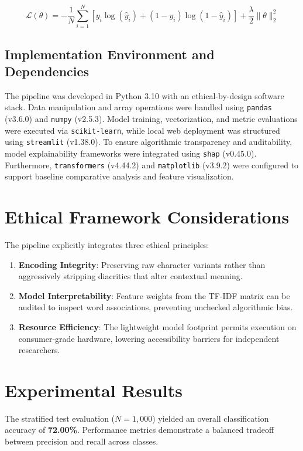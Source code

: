 \documentclass[11pt,a4paper]{article}
\begin{document}
\begin{equation}
\mathcal{L}(\theta) = -\frac{1}{N} \sum_{i=1}^{N} \left[ y_i \log(\hat{y}_i) + (1 - y_i) \log(1 - \hat{y}_i) \right] + \frac{\lambda}{2} \|\theta\|_2^2
\end{equation}

\subsection{Implementation Environment and Dependencies}
The pipeline was developed in Python 3.10 with an ethical-by-design software stack. Data manipulation and array operations were handled using \texttt{pandas} (v3.6.0) and \texttt{numpy} (v2.5.3). Model training, vectorization, and metric evaluations were executed via \texttt{scikit-learn}, while local web deployment was structured using \texttt{streamlit} (v1.38.0). To ensure algorithmic transparency and auditability, model explainability frameworks were integrated using \texttt{shap} (v0.45.0). Furthermore, \texttt{transformers} (v4.44.2) and \texttt{matplotlib} (v3.9.2) were configured to support baseline comparative analysis and feature visualization.

\section{Ethical Framework Considerations}
The pipeline explicitly integrates three ethical principles:
\begin{enumerate}
    \item \textbf{Encoding Integrity}: Preserving raw character variants rather than aggressively stripping diacritics that alter contextual meaning.
    \item \textbf{Model Interpretability}: Feature weights from the TF-IDF matrix can be audited to inspect word associations, preventing unchecked algorithmic bias.
    \item \textbf{Resource Efficiency}: The lightweight model footprint permits execution on consumer-grade hardware, lowering accessibility barriers for independent researchers.
\end{enumerate}

\section{Experimental Results}
The stratified test evaluation ($N=1,000$) yielded an overall classification accuracy of \textbf{72.00\%}. Performance metrics demonstrate a balanced tradeoff between precision and recall across classes.
\end{document}
